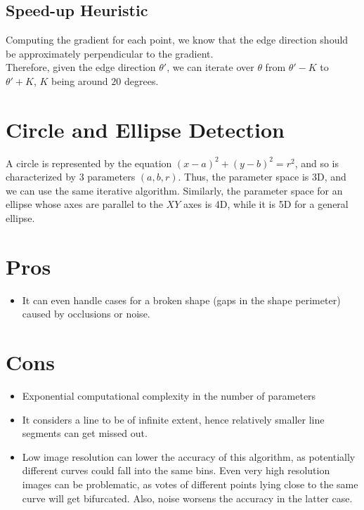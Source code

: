 \documentclass{report}
\begin{document}
\subsection{Speed-up Heuristic}

Computing the gradient for each point, we know that the edge direction should be approximately perpendicular to the gradient. \\

Therefore, given the edge direction $\theta'$, we can iterate over $\theta$ from $\theta'-K$ to $\theta'+K$, $K$ being around $20$ degrees.

\section{Circle and Ellipse Detection}

A circle is represented by the equation $(x-a)^2 + (y-b)^2 = r^2$, and so is characterized by 3 parameters $(a,b,r)$. Thus, the parameter space is 3D, and we can use the same iterative algorithm. Similarly, the parameter space for an ellipse whose axes are parallel to the $XY$ axes is 4D, while it is 5D for a general ellipse.

\section{Pros}
\begin{itemize}
  \item It can even handle cases for a broken shape (gaps in the shape perimeter) caused by occlusions or noise.
\end{itemize}

\section{Cons}
\begin{itemize}
  \item Exponential computational complexity in the number of parameters
  \item It considers a line to be of infinite extent, hence relatively smaller line segments can get missed out.
  \item Low image resolution can lower the accuracy of this algorithm, as potentially different curves could fall into the same bins. Even very high resolution images can be problematic, as votes of different points lying close to the same curve will get bifurcated. Also, noise worsens the accuracy in the latter case.
\end{itemize}
\end{document}
